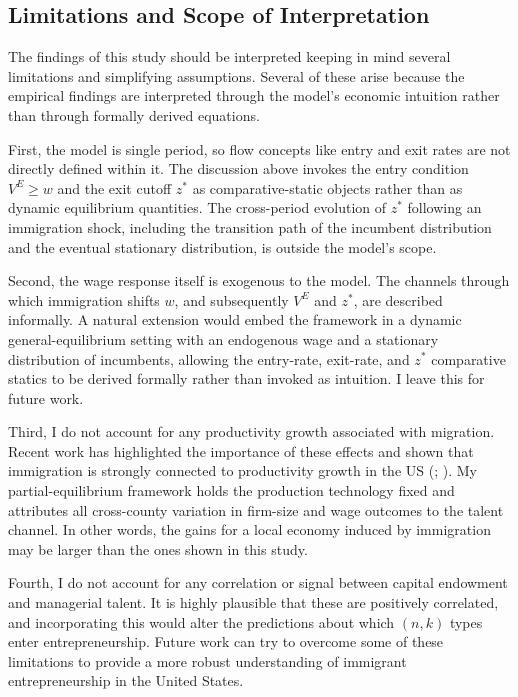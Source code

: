 \subsection{Limitations and Scope of Interpretation}


    The findings of this study should be interpreted keeping in mind several limitations and simplifying assumptions. Several of these arise because the empirical findings are interpreted through the model's economic intuition rather than through formally derived equations. 
    
    First, the model is single period, so flow concepts like entry and exit rates are not directly defined within it. The discussion above invokes the entry condition $V^{E}\geq w$ and the exit cutoff $z^{*}$ as comparative-static objects rather than as dynamic equilibrium quantities. The cross-period evolution of $z^{*}$ following an immigration shock, including the transition path of the incumbent distribution and the eventual stationary distribution, is outside the model's scope.
    
    Second, the wage response itself is exogenous to the model. The channels through which immigration shifts $w$, and subsequently $V^{E}$ and $z^{*}$, are described informally. A natural extension would embed the framework in a dynamic general-equilibrium setting with an endogenous wage and a stationary distribution of incumbents, allowing the entry-rate, exit-rate, and $z^{*}$ comparative statics to be derived formally rather than invoked as intuition. I leave this for future work.

    Third, I do not account for any productivity growth associated with migration. Recent work has highlighted the importance of these effects and shown that immigration is strongly connected to productivity growth in the US (\citealt{EffectofImmigrationProductivity}; \citealt{ImmigrationInnovationGrowth}). My partial-equilibrium framework holds the production technology fixed and attributes all cross-county variation in firm-size and wage outcomes to the talent channel. In other words, the gains for a local economy induced by immigration may be larger than the ones shown in this study.

    Fourth, I do not account for any correlation or signal between capital endowment and managerial talent. It is highly plausible that these are positively correlated, and incorporating this would alter the predictions about which $(n,k)$ types enter entrepreneurship. Future work can try to overcome some of these limitations to provide a more robust understanding of immigrant entrepreneurship in the United States.

